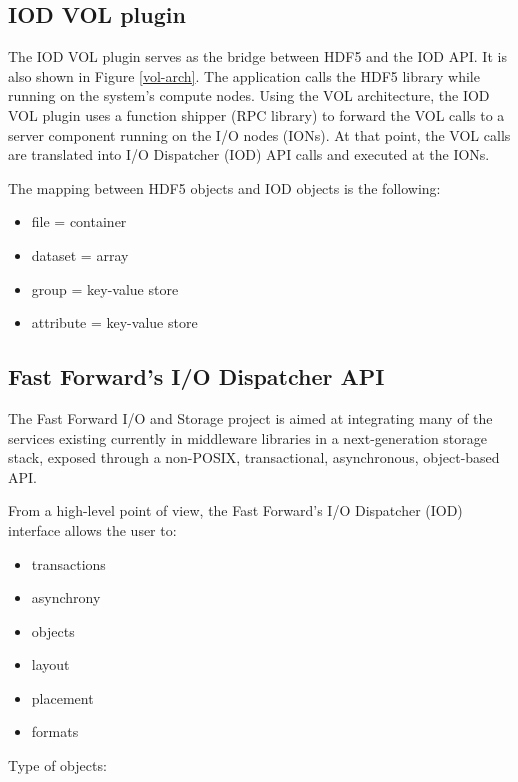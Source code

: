 \documentclass[conference]{IEEEtran}
\begin{document}
\subsection{IOD VOL plugin}\label{iod-vol-plugin}

The IOD VOL plugin serves as the bridge between HDF5 and the IOD API. It
is also shown in Figure \ref{vol-arch}. The application calls the HDF5
library while running on the system's compute nodes. Using the VOL
architecture, the IOD VOL plugin uses a function shipper (RPC library)
to forward the VOL calls to a server component running on the I/O nodes
(IONs). At that point, the VOL calls are translated into I/O Dispatcher
(IOD) API calls and executed at the IONs.

The mapping between HDF5 objects and IOD objects is the following:

\begin{itemize}
\itemsep1pt\parskip0pt
\item
  file = container
\item
  dataset = array
\item
  group = key-value store
\item
  attribute = key-value store
\end{itemize}

\subsection{Fast Forward's I/O Dispatcher
API}\label{fast-forwards-io-dispatcher-api}

The Fast Forward I/O and Storage project is aimed at integrating many of
the services existing currently in middleware libraries in a
next-generation storage stack, exposed through a non-POSIX,
transactional, asynchronous, object-based API.

From a high-level point of view, the Fast Forward's I/O Dispatcher (IOD)
interface allows the user to:

\begin{itemize}
\itemsep1pt\parskip0pt
\item
  transactions
\item
  asynchrony
\item
  objects
\item
  layout
\item
  placement
\item
  formats
\end{itemize}

Type of objects:
\end{document}

